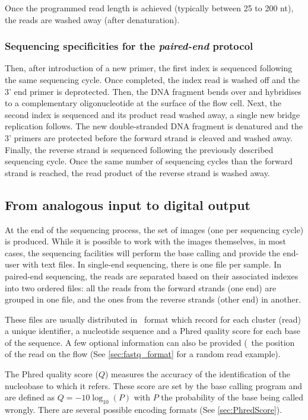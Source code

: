 Once the programmed read length is achieved (typically between 25 to 200 nt),
the reads are washed away (after denaturation).

\subsubsection{Sequencing specificities for the \emph{paired-end} protocol}

Then, after introduction of a new primer, the first index is sequenced
following the same sequencing cycle.
Once completed, the index read is washed off and the 3' end primer is deprotected.
Then, the \gls{DNA} fragment bends over and hybridises to a complementary
oligonucleotide at the surface of the flow cell.
Next, the second index is sequenced and its product read washed away,
a single new bridge replication follows.
The new double-stranded \gls{DNA} fragment is denatured and the 3' primers are
protected before the forward strand is cleaved and washed away.
Finally, the reverse strand is sequenced following the previously described
sequencing cycle. Once the same number of sequencing cycles than the forward
strand is reached, the read product of the reverse strand is washed away.

\subsection{From analogous input to digital output}

At the end of the sequencing process, the set of images (one per sequencing cycle)
is produced. While it is possible to work with the images themselves, in most
cases, the sequencing facilities will perform the base calling and provide the
end-user with text files. In single-end sequencing, there is one file per sample.
In paired-end sequencing, the reads are separated based on their associated
indexes into two ordered files: all the reads from the forward strands (one end)
are grouped in one file, and the ones from the reverse strands (other end)
in another.

These files are usually distributed in \fastq\ format
 which record for each cluster (read) a unique identifier,
a nucleotide sequence and a \gls{Phred} quality score for each base of the
sequence. A few optional information can also be provided (\eg\
the position of the read on the \gls{flow} (See \cref{sec:fastq_format} for
a random read example).

The \gls{Phred} quality score ($Q$) measures the accuracy of the identification
of the nucleobase to which it refers. These score are set by the base calling
program and are defined as $Q = -10\log_{10}(P)$ with $P$ the probability of
the base being called wrongly. There are several possible encoding formats
(See \cref{sec:PhredScore}).

